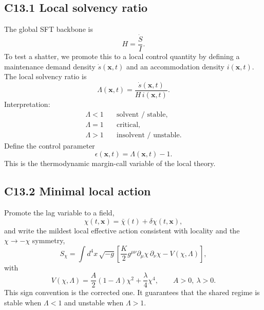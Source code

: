 \documentclass[11pt]{article}
\begin{document}
\subsection*{C13.1 Local solvency ratio}
The global SFT backbone is
\begin{equation}
H = \frac{\dot S}{I}.
\end{equation}
To test a shatter, we promote this to a local control quantity by defining a maintenance demand density $\dot s(\mathbf x,t)$ and an accommodation density $i(\mathbf x,t)$. The local solvency ratio is
\begin{equation}
\Lambda(\mathbf x,t) = \frac{\dot s(\mathbf x,t)}{H\,i(\mathbf x,t)}.
\end{equation}
Interpretation:
\begin{align*}
\Lambda < 1 &\quad \text{solvent / stable},\\
\Lambda = 1 &\quad \text{critical},\\
\Lambda > 1 &\quad \text{insolvent / unstable}.
\end{align*}
Define the control parameter
\begin{equation}
\epsilon(\mathbf x,t)=\Lambda(\mathbf x,t)-1.
\end{equation}
This is the thermodynamic margin-call variable of the local theory.

\subsection*{C13.2 Minimal local action}
Promote the lag variable to a field,
\begin{equation}
\chi(t,\mathbf x)=\bar\chi(t)+\delta\chi(t,\mathbf x),
\end{equation}
and write the mildest local effective action consistent with locality and the $\chi\to-\chi$ symmetry,
\begin{equation}
S_\chi=\int d^4x\,\sqrt{-g}\left[\frac{K}{2}g^{\mu\nu}\partial_\mu\chi\,\partial_\nu\chi - V(\chi,\Lambda)\right],
\end{equation}
with
\begin{equation}
\boxed{V(\chi,\Lambda)=\frac{A}{2}(1-\Lambda)\chi^2+\frac{\lambda}{4}\chi^4,\qquad A>0,\ \lambda>0.}
\end{equation}
This sign convention is the corrected one. It guarantees that the shared regime is stable when $\Lambda<1$ and unstable when $\Lambda>1$.
\end{document}
